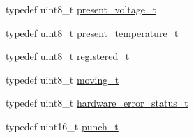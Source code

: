 \begin{DoxyCompactItemize}
\item 
typedef uint8\+\_\+t \hyperlink{structdynamixel_1_1servos_1_1_model_traits_3_01_xl320_01_4_1_1_c_t_ab3096fff6d4962cd657bbf3206ba2fc0}{present\+\_\+voltage\+\_\+t}
\item 
typedef uint8\+\_\+t \hyperlink{structdynamixel_1_1servos_1_1_model_traits_3_01_xl320_01_4_1_1_c_t_a7fea0e2689ba8bb6a8d07863aa9f6f7a}{present\+\_\+temperature\+\_\+t}
\item 
typedef uint8\+\_\+t \hyperlink{structdynamixel_1_1servos_1_1_model_traits_3_01_xl320_01_4_1_1_c_t_a96fdc830a1382e0352c5dcf7371f34ec}{registered\+\_\+t}
\item 
typedef uint8\+\_\+t \hyperlink{structdynamixel_1_1servos_1_1_model_traits_3_01_xl320_01_4_1_1_c_t_acf69989f806600c4d957dc40270e4e39}{moving\+\_\+t}
\item 
typedef uint8\+\_\+t \hyperlink{structdynamixel_1_1servos_1_1_model_traits_3_01_xl320_01_4_1_1_c_t_a1430b792b2d911dff66ba9c074002d14}{hardware\+\_\+error\+\_\+status\+\_\+t}
\item 
typedef uint16\+\_\+t \hyperlink{structdynamixel_1_1servos_1_1_model_traits_3_01_xl320_01_4_1_1_c_t_a1a822b0bd5ab67467f574132c450e117}{punch\+\_\+t}
\end{DoxyCompactItemize}
